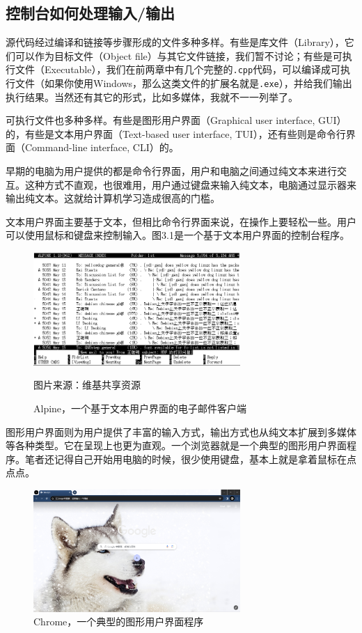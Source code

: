 \subsection*{控制台如何处理输入/输出}
源代码经过编译和链接等步骤形成的文件多种多样。有些是库文件（Library），它们可以作为目标文件（Object file）与其它文件链接，我们暂不讨论；有些是可执行文件（Executable），我们在前两章中有几个完整的\texttt{.cpp}代码，可以编译成可执行文件（如果你使用Windows，那么这类文件的扩展名就是\texttt{.exe}），并给我们输出执行结果。当然还有其它的形式，比如多媒体，我就不一一列举了。\par
可执行文件也多种多样。有些是图形用户界面（Graphical user interface, GUI）的，有些是文本用户界面（Text-based user interface, TUI），还有些则是命令行界面（Command-line interface, CLI）的。\par
早期的电脑为用户提供的都是命令行界面，用户和电脑之间通过纯文本来进行交互。这种方式不直观，也很难用，用户通过键盘来输入纯文本，电脑通过显示器来输出纯文本。这就给计算机学习造成很高的门槛。\par
文本用户界面主要基于文本，但相比命令行界面来说，在操作上要轻松一些。用户可以使用鼠标和键盘来控制输入。图3.1是一个基于文本用户界面的控制台程序。\par
\begin{figure}[htbp]
    \centering
    \includegraphics[width=0.7\textwidth]{../images/generalized_parts/03_Alpine_email_client.png}
    \caption{Alpine，一个基于文本用户界面的电子邮件客户端}
    \footnotesize{图片来源：维基共享资源}
\end{figure}
图形用户界面则为用户提供了丰富的输入方式，输出方式也从纯文本扩展到多媒体等各种类型。它在呈现上也更为直观。一个浏览器就是一个典型的图形用户界面程序。笔者还记得自己开始用电脑的时候，很少使用键盘，基本上就是拿着鼠标在点点点。\par
\begin{figure}[htbp]
    \centering
    \includegraphics[width=0.7\textwidth]{../images/generalized_parts/03_GUI_example_Chrome.png}
    \caption{Chrome，一个典型的图形用户界面程序}
\end{figure}
